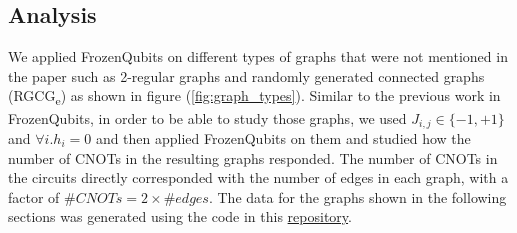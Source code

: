 \subsection{Analysis}\label{research:analysis}
We applied FrozenQubits on different types of graphs that were not mentioned in the paper such as 2-regular graphs and randomly generated connected graphs (RGCG\textsubscript{e}) as shown in figure (\ref{fig:graph_types}). Similar to the previous work in FrozenQubits, in order to be able to study those graphs, we used $J_{i,j}\in \{-1,+1\}$ and $\forall i.h_i=0$ and then applied FrozenQubits on them and studied how the number of CNOTs in the resulting graphs responded. The number of CNOTs in the circuits directly corresponded with the number of edges in each graph, with a factor of $\#CNOTs=2\times \#edges$. The data for the graphs shown in the following sections was generated using the code in this \href{https://github.com/leoschultheiss/FrozenQubitsImplementation}{repository}.
